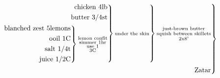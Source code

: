 \documentclass[12pt]{standalone}
\begin{document}
\[
\begin{rcases}\begin{alignedat}{3}
\begin{rcases}\begin{alignedat}{3}
\begin{rcases}\begin{alignedat}{3}
\text{chicken 4lb}\\
\text{butter 3/4st}\\
\begin{rcases}\begin{alignedat}{3}
\text{blanched zest 5lemons}\\
\text{ooil 1C}\\
\text{salt 1/4t}\\
\text{juice 1/2C}\\
\end{alignedat}\end{rcases}
\substack{\text{lemon confit}\\\text{simmer 1hr}\\\text{use 1}\\\text{3C}}\\
\end{alignedat}\end{rcases}
\substack{\text{under the skin}}\\
\end{alignedat}\end{rcases}
\substack{\text{just-brown butter}\\\text{squish between skillets}\\\text{2x8'}}\\
\text{Zatar}\\
\end{alignedat}\end{rcases}
\substack{\text{}}\\
\]
\end{document}
